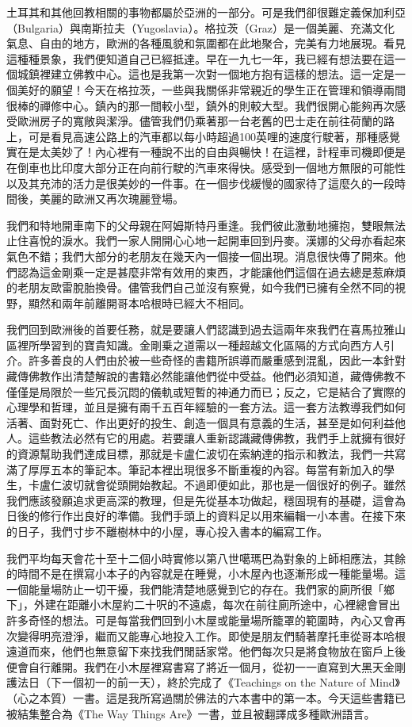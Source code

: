 土耳其和其他回教相關的事物都屬於亞洲的一部分。可是我們卻很難定義保加利亞（Bulgaria）與南斯拉夫（Yugoslavia）。格拉茨（Graz）是一個美麗、充滿文化氣息、自由的地方，歐洲的各種風貌和氛圍都在此地聚合，完美有力地展現。看見這種種景象，我們便知道自己已經抵達。早在一九七一年，我已經有想法要在這一個城鎮裡建立佛教中心。這也是我第一次對一個地方抱有這樣的想法。這一定是一個美好的願望！今天在格拉茨，一些與我關係非常親近的學生正在管理和領導兩間很棒的禪修中心。鎮內的那一間較小型，鎮外的則較大型。我們很開心能夠再次感受歐洲房子的寬敞與潔淨。儘管我們仍乘著那一台老舊的巴士走在前往荷蘭的路上，可是看見高速公路上的汽車都以每小時超過100英哩的速度行駛著，那種感覺實在是太美妙了！內心裡有一種說不出的自由與暢快！在這裡，計程車司機即便是在倒車也比印度大部分正在向前行駛的汽車來得快。感受到一個地方無限的可能性以及其充沛的活力是很美妙的一件事。在一個步伐緩慢的國家待了這麼久的一段時間後，美麗的歐洲又再次瑰麗登場。

我們和特地開車南下的父母親在阿姆斯特丹重逢。我們彼此激動地擁抱，雙眼無法止住喜悅的淚水。我們一家人開開心心地一起開車回到丹麥。漢娜的父母亦看起來氣色不錯；我們大部分的老朋友在幾天內一個接一個出現。消息很快傳了開來。他們認為這金剛乘一定是甚麼非常有效用的東西，才能讓他們這個在過去總是惹麻煩的老朋友歐雷脫胎換骨。儘管我們自己並沒有察覺，如今我們已擁有全然不同的視野，顯然和兩年前離開哥本哈根時已經大不相同。

我們回到歐洲後的首要任務，就是要讓人們認識到過去這兩年來我們在喜馬拉雅山區裡所學習到的寶貴知識。金剛乗之道需以一種超越文化區隔的方式向西方人引介。許多善良的人們由於被一些奇怪的書籍所誤導而嚴重感到混亂，因此一本針對藏傳佛教作出清楚解說的書籍必然能讓他們從中受益。他們必須知道，藏傳佛教不僅僅是局限於一些冗長沉悶的儀軌或短暫的神通力而已；反之，它是結合了實際的心理學和哲理，並且是擁有兩千五百年經驗的一套方法。這一套方法教導我們如何活著、面對死亡、作出更好的投生、創造一個具有意義的生活，甚至是如何利益他人。這些教法必然有它的用處。若要讓人重新認識藏傳佛教，我們手上就擁有很好的資源幫助我們達成目標，那就是卡盧仁波切在索納達的指示和教法，我們一共寫滿了厚厚五本的筆記本。筆記本裡出現很多不斷重複的內容。每當有新加入的學生，卡盧仁波切就會從頭開始教起。不過即便如此，那也是一個很好的例子。雖然我們應該發願追求更高深的教理，但是先從基本功做起，穩固現有的基礎，這會為日後的修行作出良好的準備。我們手頭上的資料足以用來編輯一小本書。在接下來的日子，我們寸步不離樹林中的小屋，專心投入書本的編寫工作。

我們平均每天會花十至十二個小時實修以第八世噶瑪巴為對象的上師相應法，其餘的時間不是在撰寫小本子的內容就是在睡覺，小木屋內也逐漸形成一種能量場。這一個能量場防止一切干擾，我們能清楚地感覺到它的存在。我們家的廁所很「鄉下」，外建在距離小木屋約二十呎的不遠處，每次在前往廁所途中，心裡總會冒出許多奇怪的想法。可是每當我們回到小木屋或能量場所籠罩的範圍時，內心又會再次變得明亮澄淨，繼而又能專心地投入工作。即使是朋友們騎著摩托車從哥本哈根遠道而來，他們也無意留下來找我們閒話家常。他們每次只是將食物放在窗戶上後便會自行離開。我們在小木屋裡寫書寫了將近一個月，從初一一直寫到大黑天金剛護法日（下一個初一的前一天），終於完成了《Teachings
on the Nature of
Mind》（心之本質）一書。這是我所寫過關於佛法的六本書中的第一本。今天這些書籍已被結集整合為《The
Way Things Are》一書，並且被翻譯成多種歐洲語言。

